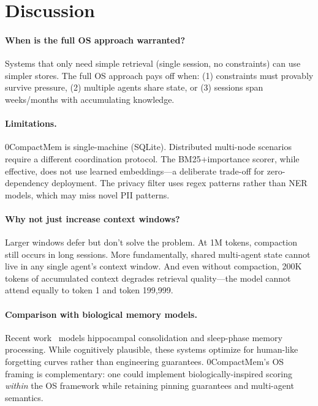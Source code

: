 \documentclass[10pt,twocolumn]{article}
\begin{document}
\section{Discussion}
\label{sec:discussion}

\paragraph{When is the full OS approach warranted?} Systems that only need simple retrieval (single session, no constraints) can use simpler stores. The full OS approach pays off when: (1) constraints must provably survive pressure, (2) multiple agents share state, or (3) sessions span weeks/months with accumulating knowledge.

\paragraph{Limitations.} 0CompactMem is single-machine (SQLite). Distributed multi-node scenarios require a different coordination protocol. The BM25+importance scorer, while effective, does not use learned embeddings---a deliberate trade-off for zero-dependency deployment. The privacy filter uses regex patterns rather than NER models, which may miss novel PII patterns.

\paragraph{Why not just increase context windows?} Larger windows defer but don't solve the problem. At 1M tokens, compaction still occurs in long sessions. More fundamentally, shared multi-agent state cannot live in any single agent's context window. And even without compaction, 200K tokens of accumulated context degrades retrieval quality---the model cannot attend equally to token 1 and token 199{,}999.

\paragraph{Comparison with biological memory models.} Recent work~\cite{humaninspired2026,episodicsemantic2026} models hippocampal consolidation and sleep-phase memory processing. While cognitively plausible, these systems optimize for human-like forgetting curves rather than engineering guarantees. 0CompactMem's OS framing is complementary: one could implement biologically-inspired scoring \emph{within} the OS framework while retaining pinning guarantees and multi-agent semantics.
\end{document}
